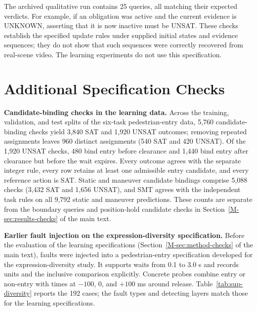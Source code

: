 \documentclass[10pt]{article}
\begin{document}
The archived qualitative run contains 25 queries, all matching their expected
verdicts. For example, if an obligation was active and the current evidence is
UNKNOWN, asserting that it is now inactive must be UNSAT. These checks establish
the specified update rules under supplied initial states and evidence
sequences; they do not show that such sequences were correctly recovered from
real-scene video. The learning experiments do not use this specification.

\section{Additional Specification Checks}\label{sup:diversity}

\textbf{Candidate-binding checks in the learning data.} Across the training,
validation, and test splits of the six-task pedestrian-entry data, 5,760
candidate-binding checks yield 3,840 SAT and 1,920 UNSAT outcomes; removing
repeated assignments leaves 960 distinct assignments (540 SAT and 420 UNSAT). Of
the 1,920 UNSAT checks, 480 bind entry before clearance and 1,440 bind entry
after clearance but before the wait expires. Every outcome agrees with the
separate integer rule, every row retains at least one admissible entry
candidate, and every reference action is SAT. Static and maneuver candidate
bindings comprise 5,088 checks (3,432 SAT and 1,656 UNSAT), and SMT agrees with
the independent task rules on all 9,792 static and maneuver predictions. These counts are separate from
the boundary queries and position-hold candidate checks in
Section~\ref{M-sec:results-checks} of the main text.

\textbf{Earlier fault injection on the expression-diversity specification.}
Before the evaluation of the learning specifications
(Section~\ref{M-sec:method-checks} of the main text), faults were injected into
a pedestrian-entry specification developed for the expression-diversity study.
It supports waits from 0.1 to 3.0 s and records units and the inclusive
comparison explicitly. Concrete probes combine entry or non-entry with times at
$-100$, 0, and $+100$ ms around release. Table~\ref{tab:sup-diversity} reports
the 192 cases; the fault types and detecting layers match those for the
learning specifications.
\end{document}
